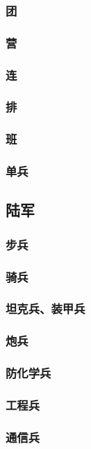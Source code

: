 \documentclass[UTF8]{../ApplicationUniverse}
\begin{document}
        \subsubsection{团}
        \subsubsection{营}
        \subsubsection{连}
        \subsubsection{排}
        \subsubsection{班}
        \subsubsection{单兵}
    \subsection{陆军}
        \subsubsection{步兵}
        \subsubsection{骑兵}
        \subsubsection{坦克兵、装甲兵}
        \subsubsection{炮兵}
        \subsubsection{防化学兵}
        \subsubsection{工程兵}
        \subsubsection{通信兵}
\end{document}
